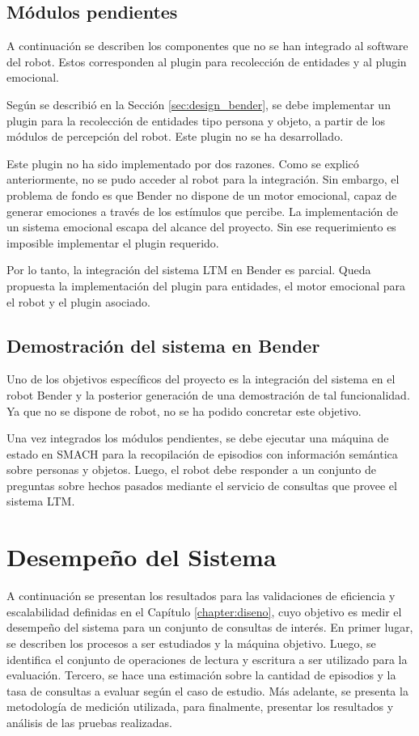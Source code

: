 \subsection{Módulos pendientes}

A continuación se describen los componentes que no se han integrado al software del robot. Estos corresponden al plugin para recolección de entidades y al plugin emocional.

 Según se describió en la Sección \ref{sec:design_bender}, se debe implementar un plugin para la recolección de entidades tipo persona y objeto, a partir de los módulos de percepción del robot. Este plugin no se ha desarrollado.

 Este plugin no ha sido implementado por dos razones. Como se explicó anteriormente, no se pudo acceder al robot para la integración. Sin embargo, el problema de fondo es que Bender no dispone de un motor emocional, capaz de generar emociones a través de los estímulos que percibe. La implementación de un sistema emocional escapa del alcance del proyecto. Sin ese requerimiento es imposible implementar el plugin requerido.

Por lo tanto, la integración del sistema LTM en Bender es parcial. Queda propuesta la implementación del plugin para entidades, el motor emocional para el robot y el plugin asociado.

\subsection{Demostración del sistema en Bender}

Uno de los objetivos específicos del proyecto es la integración del sistema en el robot Bender y la posterior generación de una demostración de tal funcionalidad. Ya que no se dispone de robot, no se ha podido concretar este objetivo. 

Una vez integrados los módulos pendientes, se debe ejecutar una máquina de estado en SMACH para la recopilación de episodios con información semántica sobre personas y objetos. Luego, el robot debe responder a un conjunto de preguntas sobre hechos pasados mediante el servicio de consultas que provee el sistema LTM.


\section{Desempeño del Sistema}

A continuación se presentan los resultados para las validaciones de eficiencia y escalabilidad definidas en el Capítulo \ref{chapter:diseno}, cuyo objetivo es medir el desempeño del sistema para un conjunto de consultas de interés. En primer lugar, se describen los procesos a ser estudiados y la máquina objetivo. Luego, se identifica el conjunto de operaciones de lectura y escritura a ser utilizado para la evaluación. Tercero, se hace una estimación sobre la cantidad de episodios y la tasa de consultas a evaluar según el caso de estudio. Más adelante, se presenta la metodología de medición utilizada, para finalmente, presentar los resultados y análisis de las pruebas realizadas.

